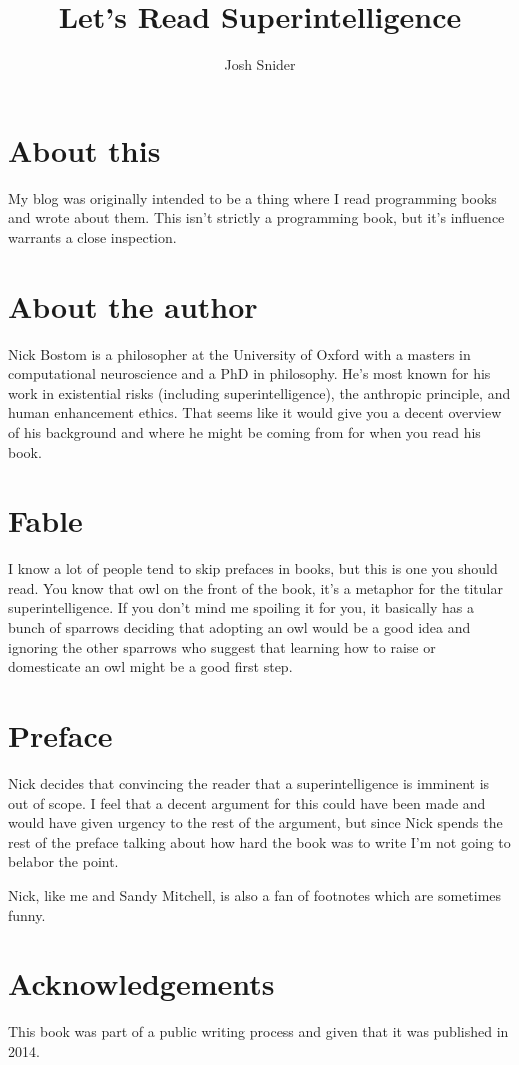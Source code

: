 \documentclass{scrartcl}
\title{Let's Read Superintelligence}
\author{Josh Snider}
\begin{document}
\maketitle
\section*{About this}
My blog was originally intended to be a thing where I read programming books and wrote about them. This isn't strictly a
programming book, but it's influence warrants a close inspection.
\section*{About the author}
Nick Bostom is a philosopher at the University of Oxford with a masters in computational neuroscience and a PhD in philosophy.
He's most known for his work in existential risks (including superintelligence), the anthropic principle, and human enhancement ethics.
That seems like it would give you a decent overview of his background and where he might be coming from for when you read
his book.
\section*{Fable}
I know a lot of people tend to skip prefaces in books, but this is one you should read. You know that owl on the front of the book,
it's a metaphor for the titular superintelligence. If you don't mind me spoiling it for you, it basically has a bunch of sparrows deciding
that adopting an owl would be a good idea and ignoring the other sparrows who suggest that learning how to raise or domesticate
an owl might be a good first step.
\section*{Preface}
Nick decides that convincing the reader that a superintelligence is imminent is out of scope. I feel that a decent argument for
this could have been made and would have given urgency to the rest of the argument, but since Nick spends the rest of the preface
talking about how hard the book was to write I'm not going to belabor the point.

Nick, like me and Sandy Mitchell, is also a fan of footnotes which are sometimes funny.
\section*{Acknowledgements}
This book was part of a public writing process and given that it was published in 2014.
\end{document}
